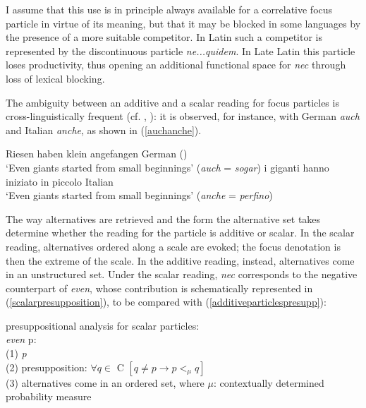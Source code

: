\documentclass[output=paper,modfonts,nonflat,citecolor=brown,
showindex
]{langsci/langscibook}
\begin{document}
I assume that this use is in principle always available for a correlative focus particle in virtue of its meaning, but that it may be blocked in some languages by the presence of a more suitable competitor. In Latin such a competitor is represented by the discontinuous particle {\emph{ne...quidem}}. In Late Latin this particle loses productivity, thus opening an additional functional space for {\emph{nec}} through loss of lexical blocking.

The ambiguity between an additive and a scalar reading for focus particles is cross-linguistically frequent (cf. \citealt[158-159]{Koenig91}, \citealt[24-25]{GastAuwera11}): it is observed, for instance, with German {\emph{auch}} and Italian {\emph{anche}}, as shown in (\ref{auchanche}).  

{\begin{exe}
\ex \label{auchanche}
\begin{xlist}
 Riesen haben klein angefangen \hfill German (\citealt[62]{Koenig91})\\
`Even giants started from small beginnings' ({\emph{auch}} = {\emph{sogar}})
 i giganti hanno iniziato in piccolo \hfill Italian\\
`Even giants started from small beginnings' ({\emph{anche}} = {\emph{perfino}})
\end{xlist}
\end{exe}}

\noindent The way alternatives are retrieved and the form the alternative set takes determine whether the reading for the particle is additive or scalar. In the scalar reading, alternatives ordered along a scale are evoked; the focus denotation is then the extreme of the scale. In the additive reading, instead, alternatives come in an unstructured set. Under the scalar reading, {\emph{nec}} corresponds to the negative counterpart of {\emph{even}}, whose contribution is schematically represented in (\ref{scalarpresupposition}), to be compared with (\ref{additiveparticlespresupp}): %

{\begin{exe}
\ex \label{scalarpresupposition} presuppositional analysis for scalar particles:\\
{\emph{even}} p:\\
(1) {\emph{p}}\\
(2) presupposition: $\forall q \in$ C $[q \neq p \rightarrow p <_{\mu} q]$\\
(3) alternatives come in an ordered set, where ${\mu}$: contextually determined probability measure %
\end{exe}} 
\end{document}
